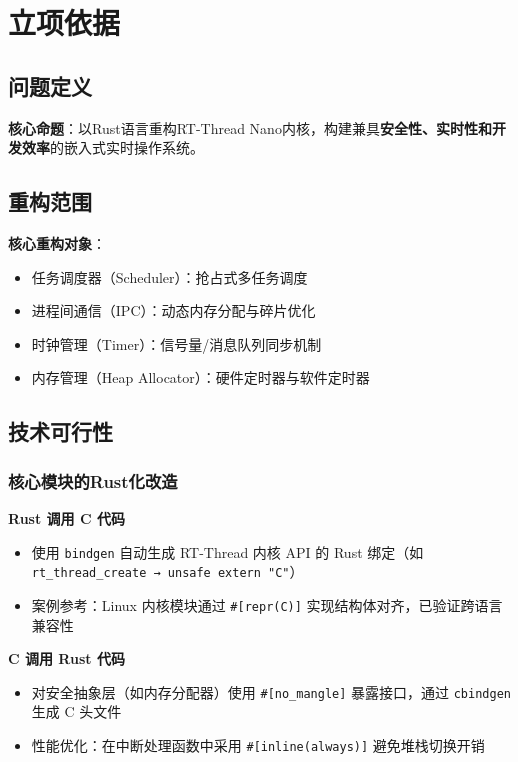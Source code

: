 
\section{立项依据}

\subsection{问题定义}

\textbf{核心命题}：以Rust语言重构RT-Thread Nano内核，构建兼具\textbf{安全性、实时性和开发效率}的嵌入式实时操作系统。

\subsection{重构范围}

\textbf{核心重构对象}：

\begin{itemize}
    \item 任务调度器（Scheduler）：抢占式多任务调度
    \item 进程间通信（IPC）：动态内存分配与碎片优化
    \item 时钟管理（Timer）：信号量/消息队列同步机制
    \item 内存管理（Heap Allocator）：硬件定时器与软件定时器
\end{itemize}

\subsection{技术可行性}

\subsubsection{核心模块的Rust化改造}
\textbf{Rust 调用 C 代码}
\begin{itemize}
    \item 使用 \texttt{bindgen} 自动生成 RT-Thread 内核 API 的 Rust 绑定（如 \texttt{rt\_thread\_create → unsafe extern "C"}）\cite{RustBindgen}
    \item 案例参考：Linux 内核模块通过 \texttt{\#[repr(C)]} 实现结构体对齐，已验证跨语言兼容性
\end{itemize}

\textbf{C 调用 Rust 代码}
\begin{itemize}
    \item 对安全抽象层（如内存分配器）使用 \texttt{\#[no\_mangle]} 暴露接口，通过 \texttt{cbindgen} 生成 C 头文件\cite{RustCbindgen}
    \item 性能优化：在中断处理函数中采用 \texttt{\#[inline(always)]} 避免堆栈切换开销
\end{itemize}

